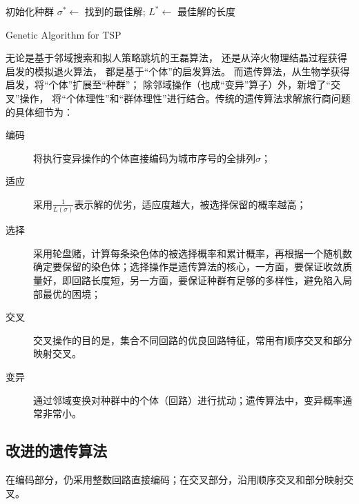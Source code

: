 \documentclass[12pt]{ctexart}
\begin{document}
\IncMargin{1em}
\begin{algorithm}[H]
    \BlankLine
    初始化种群\;
    $\sigma^* \leftarrow$ 找到的最佳解; $L^* \leftarrow$ 最佳解的长度\;
    \caption{Genetic Algorithm for TSP}
\end{algorithm}
\DecMargin{1em}

无论是基于邻域搜索和拟人策略跳坑的王磊算法，
还是从淬火物理结晶过程获得启发的模拟退火算法，
都是基于“个体”的启发算法。
而遗传算法，从生物学获得启发，将“个体”扩展至“种群”；
除邻域操作（也成“变异”算子）外，新增了“交叉”操作，
将“个体理性”和“群体理性”进行结合。传统的遗传算法求解旅行商问题的具体细节为：

\begin{description}
    \item[编码] 将执行变异操作的个体直接编码为城市序号的全排列$\sigma$；
    \item[适应] 采用$\frac{1}{L(\sigma)}$表示解的优劣，适应度越大，被选择保留的概率越高；
    \item[选择] 采用轮盘赌，计算每条染色体的被选择概率和累计概率，再根据一个随机数确定要保留的染色体；选择操作是遗传算法的核心，一方面，要保证收敛质量好，即回路长度短，另一方面，要保证种群有足够的多样性，避免陷入局部最优的困境；
    \item[交叉] 交叉操作的目的是，集合不同回路的优良回路特征，常用有顺序交叉和部分映射交叉。
    \item[变异] 通过邻域变换对种群中的个体（回路）进行扰动；遗传算法中，变异概率通常非常小。
\end{description}

\subsection{改进的遗传算法}

在编码部分，仍采用整数回路直接编码；在交叉部分，沿用顺序交叉和部分映射交叉。
\end{document}
